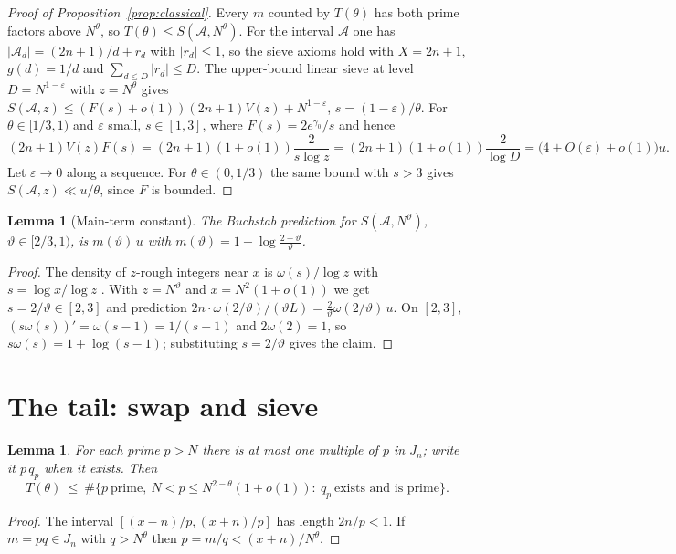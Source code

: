 \documentclass[11pt]{article}
\newtheorem{lemma}[theorem]{Lemma}
\theoremstyle{remark}
\newcommand{\N}{N}
\newcommand{\J}{J_n}
\newcommand{\A}{\mathcal{A}}
\begin{document}
\begin{proof}[Proof of Proposition~\ref{prop:classical}]
Every $m$ counted by $T(\theta)$ has both prime factors above $\N^{\theta}$, so
$T(\theta)\le S(\A,\N^{\theta})$. For the interval $\A$ one has
$|\A_d|=(2n+1)/d+r_d$ with $|r_d|\le 1$, so the sieve axioms hold with $X=2n+1$,
$g(d)=1/d$ and $\sum_{d\le D}|r_d|\le D$. The upper-bound linear sieve at level
$D=\N^{1-\varepsilon}$ with $z=\N^{\theta}$ gives
$S(\A,z)\le (F(s)+o(1))(2n+1)V(z)+\N^{1-\varepsilon}$, $s=(1-\varepsilon)/\theta$.
For $\theta\in[1/3,1)$ and $\varepsilon$ small, $s\in[1,3]$, where $F(s)=2e^{\gamma_0}/s$
and hence
\[
(2n+1)V(z)F(s)=(2n+1)(1+o(1))\frac{2}{s\log z}=(2n+1)(1+o(1))\frac{2}{\log D}
=\bigl(4+O(\varepsilon)+o(1)\bigr)u .
\]
Let $\varepsilon\to 0$ along a sequence. For $\theta\in(0,1/3)$ the same bound with
$s>3$ gives $S(\A,z)\ll u/\theta$, since $F$ is bounded.
\end{proof}

\begin{lemma}[Main-term constant]\label{lem:constant}
The Buchstab prediction for $S(\A,\N^{\vartheta})$, $\vartheta\in[2/3,1)$, is
$m(\vartheta)\,u$ with $m(\vartheta)=1+\log\frac{2-\vartheta}{\vartheta}$.
\end{lemma}

\begin{proof}
The density of $z$-rough integers near $x$ is $\omega(s)/\log z$ with
$s=\log x/\log z$ \cite[III.6]{Tenenbaum}. With $z=\N^{\vartheta}$ and $x=\N^{2}(1+o(1))$
we get $s=2/\vartheta\in[2,3]$ and prediction
$2n\cdot \omega(2/\vartheta)/(\vartheta L)=\tfrac{2}{\vartheta}\omega(2/\vartheta)\,u$.
On $[2,3]$, $(s\omega(s))'=\omega(s-1)=1/(s-1)$ and $2\omega(2)=1$, so
$s\omega(s)=1+\log(s-1)$; substituting $s=2/\vartheta$ gives the claim.
\end{proof}

\section{The tail: swap and sieve}\label{sec:tail-setup}

\begin{lemma}\label{lem:swap}
For each prime $p>\N$ there is at most one multiple of $p$ in $\J$; write it $p\,q_p$
when it exists. Then
\[
T(\theta)\ \le\ \#\{p\ \mathrm{prime},\ \N<p\le \N^{2-\theta}(1+o(1)):\ q_p\ \text{exists and is prime}\}.
\]
\end{lemma}

\begin{proof}
The interval $[(x-n)/p,(x+n)/p]$ has length $2n/p<1$. If $m=pq\in\J$ with
$q>\N^{\theta}$ then $p=m/q<(x+n)/\N^{\theta}$.
\end{proof}
\end{document}

